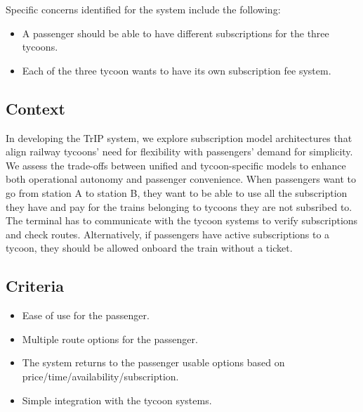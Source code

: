 Specific concerns identified for the system include the following:
\begin{itemize}
    \item A passenger should be able to have different subscriptions for the three tycoons.
    \item Each of the three tycoon wants to have its own subscription fee system.
\end{itemize}

\subsection*{Context}
In developing the TrIP system, we explore subscription model architectures that align railway tycoons' need for flexibility with passengers' demand for simplicity. 
We assess the trade-offs between unified and tycoon-specific models to enhance both operational autonomy and passenger convenience.
When passengers want to go from station A to station B, they want to be able to use all the subscription they have and pay for the trains belonging to tycoons they are not subsribed to.
The terminal has to communicate with the tycoon systems to verify subscriptions and check routes.
Alternatively, if passengers have active subscriptions to a tycoon, they should be allowed onboard the train without a ticket. 

\subsection*{Criteria}
\begin{itemize}
    \item Ease of use for the passenger.
    \item Multiple route options for the passenger.
    \item The system returns to the passenger usable options based on price/time/availability/subscription.
    \item Simple integration with the tycoon systems.
\end{itemize}

